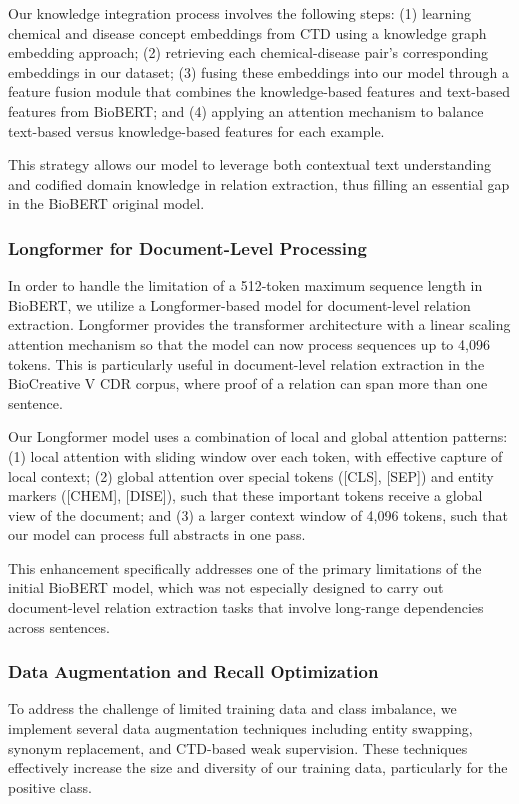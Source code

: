 \documentclass{amia}
\begin{document}
Our knowledge integration process involves the following steps: (1) learning chemical and disease concept embeddings from CTD using a knowledge graph embedding approach; (2) retrieving each chemical-disease pair's corresponding embeddings in our dataset; (3) fusing these embeddings into our model through a feature fusion module that combines the knowledge-based features and text-based features from BioBERT; and (4) applying an attention mechanism to balance text-based versus knowledge-based features for each example.

This strategy allows our model to leverage both contextual text understanding and codified domain knowledge in relation extraction, thus filling an essential gap in the BioBERT original model.

\subsubsection*{Longformer for Document-Level Processing}
In order to handle the limitation of a 512-token maximum sequence length in BioBERT, we utilize a Longformer-based model for document-level relation extraction. Longformer provides the transformer architecture with a linear scaling attention mechanism so that the model can now process sequences up to 4,096 tokens. This is particularly useful in document-level relation extraction in the BioCreative V CDR corpus, where proof of a relation can span more than one sentence.

Our Longformer model uses a combination of local and global attention patterns: (1) local attention with sliding window over each token, with effective capture of local context; (2) global attention over special tokens ([CLS], [SEP]) and entity markers ([CHEM], [DISE]), such that these important tokens receive a global view of the document; and (3) a larger context window of 4,096 tokens, such that our model can process full abstracts in one pass.

This enhancement specifically addresses one of the primary limitations of the initial BioBERT model, which was not especially designed to carry out document-level relation extraction tasks that involve long-range dependencies across sentences.

\subsubsection*{Data Augmentation and Recall Optimization}
To address the challenge of limited training data and class imbalance, we implement several data augmentation techniques including entity swapping, synonym replacement, and CTD-based weak supervision. These techniques effectively increase the size and diversity of our training data, particularly for the positive class.
\end{document}
